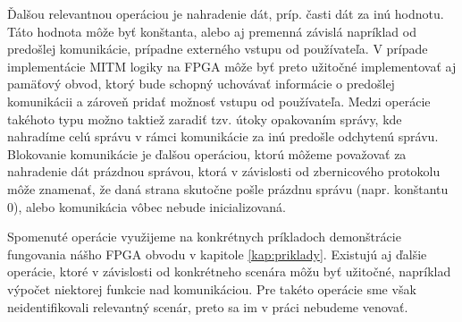 Ďalšou relevantnou operáciou je nahradenie dát, príp. časti dát za inú hodnotu. Táto hodnota môže byť konštanta, alebo aj premenná závislá napríklad od predošlej komunikácie, prípadne externého vstupu od používateľa. V prípade implementácie MITM logiky na FPGA môže byť preto užitočné implementovať aj pamäťový obvod, ktorý bude schopný uchovávať informácie o predošlej komunikácii a zároveň pridať možnosť vstupu od používateľa. Medzi operácie takéhoto typu možno taktiež zaradiť tzv. útoky opakovaním správy, kde nahradíme celú správu v rámci komunikácie za inú predošle odchytenú správu. Blokovanie komunikácie je ďalšou operáciou, ktorú môžeme považovať za nahradenie dát prázdnou správou, ktorá v závislosti od zbernicového protokolu môže znamenať, že daná strana skutočne pošle prázdnu správu (napr. konštantu 0), alebo komunikácia vôbec nebude inicializovaná.

Spomenuté operácie využijeme na konkrétnych príkladoch demonštrácie fungovania nášho FPGA obvodu v kapitole \ref{kap:priklady}. Existujú aj ďalšie operácie, ktoré v závislosti od konkrétneho scenára môžu byť užitočné, napríklad výpočet niektorej funkcie nad komunikáciou. Pre takéto operácie sme však neidentifikovali relevantný scenár, preto sa im v práci nebudeme venovať.